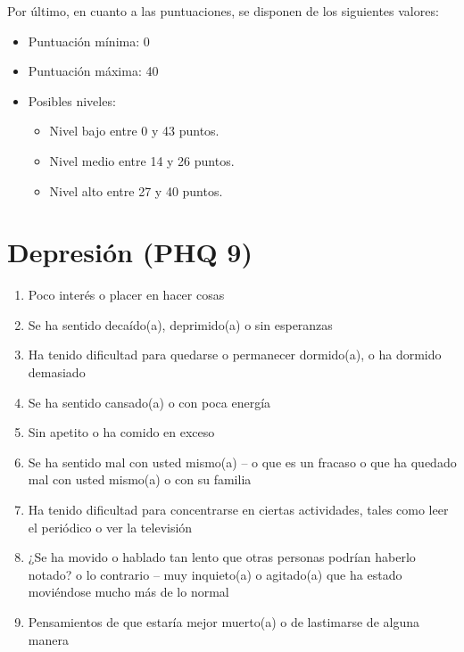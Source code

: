         Por último, en cuanto a las puntuaciones, se disponen de los siguientes valores:
        \begin{itemize}
            \item Puntuación mínima: 0
            \item Puntuación máxima: 40
            \item Posibles niveles:
                \begin{itemize}
                    \item Nivel bajo entre 0 y 43 puntos.
                    \item Nivel medio entre 14 y 26 puntos.
                    \item Nivel alto entre 27 y 40 puntos.
                \end{itemize}
        \end{itemize} 

    \section{Depresión (PHQ 9)}
    \label{cuestionarios:phq_9}
        \begin{enumerate}
            \item Poco interés o placer en hacer cosas
            \item Se ha sentido decaído(a), deprimido(a) o sin esperanzas 
            \item Ha tenido dificultad para quedarse o permanecer dormido(a), o ha dormido demasiado 
            \item Se ha sentido cansado(a) o con poca energía 
            \item Sin apetito o ha comido en exceso
            \item Se ha sentido mal con usted mismo(a) – o que es un fracaso o que ha quedado mal con usted mismo(a) o con su familia
            \item Ha tenido dificultad para concentrarse en ciertas actividades, tales como leer el periódico o ver la televisión
            \item ¿Se ha movido o hablado tan lento que otras personas podrían haberlo notado? o lo contrario – muy inquieto(a) o agitado(a) que ha estado moviéndose mucho más de lo normal
            \item Pensamientos de que estaría mejor muerto(a) o de lastimarse de alguna manera
        \end{enumerate}
        
